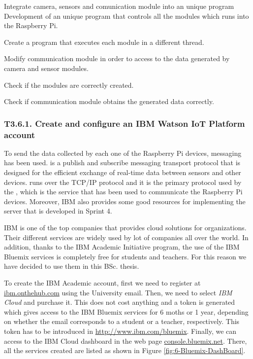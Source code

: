 {Integrate camera, sensors and comunication module into an unique program}
{Development of an unique program that controls all the modules which runs into the Raspberry Pi.}
{	\item Create a program that executes each module in a different thread.
	\item Modify communication module in order to access to the data generated by camera and sensor modules.
}{	\item Check if the modules are correctly created.
	\item Check if communication module obtains the generated data correctly.
}

\clearpage
\subsubsection{T3.6.1. Create and configure an IBM Watson IoT Platform account}

To send the data collected by each one of the Raspberry Pi devices,  messaging has been used.  is a publish and subscribe messaging transport protocol that is designed for the efficient exchange of real-time data between sensors and other devices.  runs over the TCP/IP protocol and it is the primary protocol used by the , which is the service that has been used to communicate the Raspberry Pi devices. Moreover, IBM also provides some good resources for implementing the server that is developed in Sprint 4. 

IBM is one of the top companies that provides cloud solutions for organizations. Their different services are widely used by lot of companies all over the world. In addition, thanks to the IBM Academic Initiative program, the use of the IBM Bluemix services is completely free for students and teachers. For this reason we have decided to use them in this \ac{BSc.} thesis.

To create the IBM Academic account, first we need to register at \url{ibm.onthehub.com} using the University email. Then, we need to select \emph{IBM Cloud} and purchase it. This does not cost anything and a token is generated which gives access to the IBM Bluemix services for 6 moths or 1 year, depending on whether the email corresponds to a student or a teacher, respectively. This token has to be introduced in \url{http://www.ibm.com/bluemix}. Finally, we can access to the IBM Cloud dashboard in the web page \url{console.bluemix.net}. There, all the services created are listed as shown in Figure \ref{fig:6-Bluemix-DashBoard}. 

